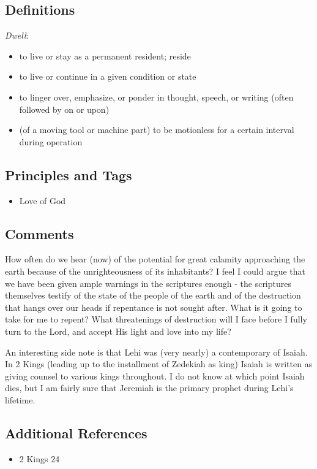\documentclass[12pt]{report}
\begin{document}
\subsection{Definitions\label{1Nephi1:4:DFN}}
\emph{Dwell}: \begin{itemize}
\item to live or stay as a permanent resident; reside
\item to live or continue in a given condition or state
\item to linger over, emphasize, or ponder in thought, speech, or writing (often followed by on or upon)
\item (of a moving tool or machine part) to be motionless for a certain interval during operation
\end{itemize}

\subsection{Principles and Tags\label{1Nephi1:4:principles}}
\begin{itemize}
\item {}Love of God
\end{itemize}

\subsection{Comments\label{1Nephi1:4:comments}}
How often do we hear (now) of the potential for great calamity approaching the earth because of the unrighteousness of its inhabitants?  I feel I could argue that we have been given ample warnings in the scriptures enough - the scriptures themselves testify of the state of the people of the earth and of the destruction that hangs over our heads if repentance is not sought after.  What is it going to take for me to repent?  What threatenings of destruction will I face before I fully turn to the Lord, and accept His light and love into my life?

An interesting side note is that Lehi was (very nearly) a contemporary of Isaiah.  In 2 Kings (leading up to the installment of Zedekiah as king) Isaiah is written as giving counsel to various kings throughout.  I do not know at which point Isaiah dies, but I am fairly sure that Jeremiah is the primary prophet during Lehi's lifetime.

\subsection{Additional References\label{1Nephi1:4:references}}
\begin{itemize}
\item 2 Kings 24
\end{itemize}
\end{document}
